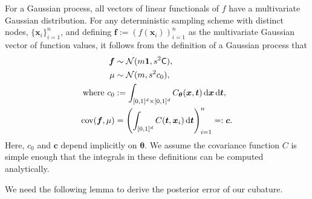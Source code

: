 \documentclass{svjour3}                     %
\newcommand{\bm}[1]{\boldsymbol{#1}}
\newcommand{\dif}[1]{\text{d}{#1}}
\newcommand{\D}[1]{\text{d}{#1}}
\newcommand{\vtheta}{{\bm{\theta}}}
\newcommand{\vc}{\bm{c}}
\newcommand{\vf}{\bm{f}}
\newcommand{\vt}{\bm{t}}
\newcommand{\vx}{\bm{x}}
\newcommand{\vone}{\bm{1}}
\newcommand{\mC}{\mathsf{C}}
\newcommand{\cov}{{\textup{cov}}}
\newcommand{\calN}{\mathcal{N}}
\begin{document}
For a Gaussian process, all vectors of linear functionals of $f$ have a multivariate Gaussian distribution. 
For any deterministic sampling scheme with distinct nodes, $\{\vx_i\}_{i=1}^n$, and defining  $\vf  := \left( f(\vx_i)\right)_{i=1}^n$ as the multivariate Gaussian vector of function values, it follows from the definition of a Gaussian process that 
\begin{subequations} \label{eqn:fGaussDist}
	\begin{align}
	\vf  & \sim \calN(m \vone, s^2 \mC), \\
	\mu & \sim \calN(m, s^2 c_0), \\
	\label{eqn:fGaussDist_c0}
	\text{where }
	c_0 &:= \int_{[0,1]^{d} \times [0,1]^{d}} C_\vtheta(\vx,\vt) \, \dif{\vx} \, \dif{\vt}, \\
	\label{eqn:fGaussDist_vc}
	\cov(\vf, \mu) &= \left(  \int_{[0,1]^d} C(\vt,\vx_i) \, \D \vt \right)_{i=1}^n  =: \vc.
	\end{align}
\end{subequations}
Here, $c_0$ and $\vc$ depend implicitly on $\vtheta$.  We assume the covariance function $C$ is simple enough that the integrals in these definitions can be computed analytically.

\iffalse
We need the following lemma to derive the posterior error of our cubature. 
\end{document}
